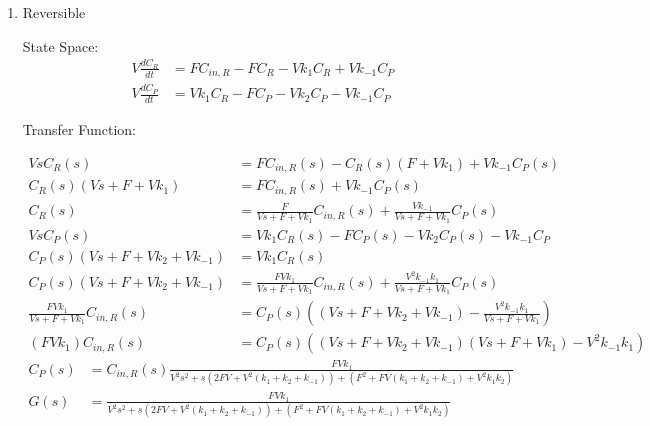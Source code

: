 \documentclass[12pt]{article}
\begin{document}
\begin{enumerate}
\begin{enumerate}
    \item

    Reversible

    State Space:
    \begin{align*}
        V \frac{dC_R}{dt} &= F C_{in,R} - F C_R - V k_1 C_R + V k_{-1} C_P \\
        V \frac{dC_P}{dt} &= V k_1 C_R - F C_P - V k_2 C_P - V k_{-1} C_P
    \end{align*}

    Transfer Function:

    \begin{align*}
        V s C_R(s) &= F C_{in,R}(s) - C_R(s) (F + V k_1) + V k_{-1} C_P(s) \\
        C_R(s) (V s + F + V k_1) &= F C_{in,R}(s) + V k_{-1} C_P(s) \\
        C_R(s) &= \frac{F}{V s + F + V k_1} C_{in,R}(s) + \frac{V k_{-1}}{V s + F + V k_1} C_P(s) \\
        V s C_P(s) &= V k_1 C_R(s) - F C_P(s) - V k_2 C_P(s) - V k_{-1} C_P \\
        C_P(s) (V s + F + V k_2 + V k_{-1}) &= V k_1 C_R(s) \\
        C_P(s) (V s + F + V k_2 + V k_{-1}) &= \frac{F V k_1}{V s + F + V k_1} C_{in,R}(s) + \frac{V^2 k_{-1} k_1}{V s + F + V k_1} C_P(s) \\
        \frac{F V k_1}{V s + F + V k_1} C_{in,R}(s) &= C_P(s) \left((V s + F + V k_2 + V k_{-1}) - \frac{V^2 k_{-1} k_1}{V s + F + V k_1}\right) \\
        (F V k_1) C_{in,R}(s) &= C_P(s) \left((V s + F + V k_2 + V k_{-1}) (V s + F + V k_1) - V^2 k_{-1} k_1\right)
    \end{align*}
    \begin{align*}
        C_P(s) &= C_{in,R}(s) \frac{F V k_1}{V^2 s^2 + s (2 F V + V^2 (k_1 + k_2 + k_{-1})) + (F^2 + F V (k_1 + k_2 + k_{-1}) + V^2 k_1 k_2)} \\
        G(s) &= \frac{F V k_1}{V^2 s^2 + s (2 F V + V^2 (k_1 + k_2 + k_{-1})) + (F^2 + F V (k_1 + k_2 + k_{-1}) + V^2 k_1 k_2)}
    \end{align*}





\end{enumerate}
\end{enumerate}
\end{document}
